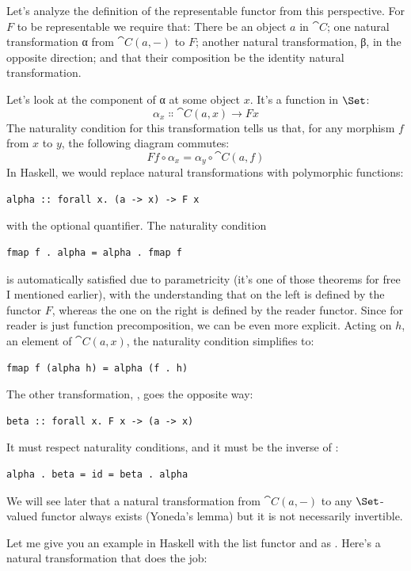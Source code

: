Let's analyze the definition of the representable functor from this
perspective. For $F$ to be representable we require that: There
be an object $a$ in $\cat{C}$; one natural transformation α from
$\cat{C}(a, -)$ to $F$; another natural transformation, β, in
the opposite direction; and that their composition be the identity
natural transformation.

Let's look at the component of α at some object $x$. It's a
function in $\Set$:
\[\alpha_x \Colon \cat{C}(a, x) \to F x\]
The naturality condition for this transformation tells us that, for any
morphism $f$ from $x$ to $y$, the following diagram
commutes:
\[F f \circ \alpha_x = \alpha_y \circ \cat{C}(a, f)\]
In Haskell, we would replace natural transformations with polymorphic
functions:

\begin{Verbatim}
alpha :: forall x. (a -> x) -> F x
\end{Verbatim}
with the optional  quantifier. The naturality condition

\begin{Verbatim}
fmap f . alpha = alpha . fmap f
\end{Verbatim}
is automatically satisfied due to parametricity (it's one of those
theorems for free I mentioned earlier), with the understanding that
 on the left is defined by the functor $F$, whereas
the one on the right is defined by the reader functor. Since
 for reader is just function precomposition, we can be even
more explicit. Acting on $h$, an element of $\cat{C}(a, x)$,
the naturality condition simplifies to:

\begin{Verbatim}
fmap f (alpha h) = alpha (f . h)
\end{Verbatim}
The other transformation, , goes the opposite way:

\begin{Verbatim}
beta :: forall x. F x -> (a -> x)
\end{Verbatim}
It must respect naturality conditions, and it must be the inverse of :

\begin{Verbatim}
alpha . beta = id = beta . alpha
\end{Verbatim}
We will see later that a natural transformation from $\cat{C}(a, -)$
to any $\Set$-valued functor always exists (Yoneda's lemma) but it
is not necessarily invertible.

Let me give you an example in Haskell with the list functor and
 as . Here's a natural transformation that does
the job:

